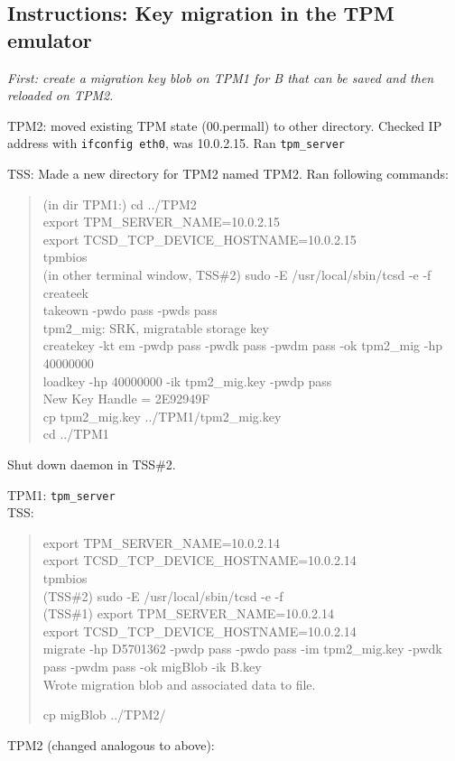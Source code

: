 \documentclass[10pt]{article}
\newcommand{\command}[1]{\texttt{#1}}
\begin{document}
\subsection{Instructions: Key migration in the TPM emulator}
\textit{First: create a migration key blob on TPM1 for B that can be saved and then reloaded on TPM2.}

TPM2: moved existing TPM state (00.permall) to other directory. Checked IP address with \command{ifconfig eth0}, was 10.0.2.15. Ran \command{tpm\_server}

TSS: Made a new directory for TPM2 named TPM2. Ran following commands: \\
\begin{quote}
(in dir TPM1:) cd ../TPM2 \\
export TPM\_SERVER\_NAME=10.0.2.15 \\
export TCSD\_TCP\_DEVICE\_HOSTNAME=10.0.2.15 \\
tpmbios \\
(in other terminal window, TSS\#2) sudo -E /usr/local/sbin/tcsd -e -f \\

createek \\
takeown -pwdo pass -pwds pass\\

tpm2\_mig: SRK, migratable storage key \\
createkey -kt em -pwdp pass -pwdk pass -pwdm pass -ok tpm2\_mig -hp 40000000\\
loadkey -hp 40000000 -ik tpm2\_mig.key -pwdp pass\\
New Key Handle =  2E92949F\\

cp tpm2\_mig.key ../TPM1/tpm2\_mig.key \\
cd ../TPM1
\end{quote}

Shut down daemon in TSS\#2.

TPM1:  \command{tpm\_server } \\

TSS: \\
\begin{quote}
export TPM\_SERVER\_NAME=10.0.2.14 \\
export TCSD\_TCP\_DEVICE\_HOSTNAME=10.0.2.14 \\
tpmbios \\
(TSS\#2) sudo -E /usr/local/sbin/tcsd -e -f \\

(TSS\#1) export TPM\_SERVER\_NAME=10.0.2.14 \\
export TCSD\_TCP\_DEVICE\_HOSTNAME=10.0.2.14 \\
    
migrate -hp D5701362 -pwdp pass -pwdo pass -im tpm2\_mig.key -pwdk pass -pwdm pass -ok migBlob -ik B.key\\
Wrote migration blob and associated data to file.

cp migBlob ../TPM2/

\end{quote}
TPM2 (changed analogous to above):
\end{document}
